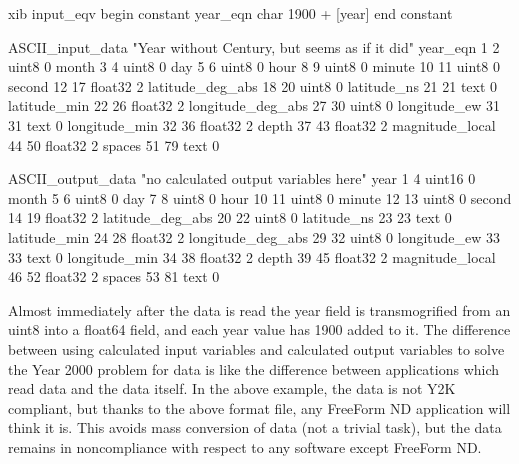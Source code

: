 \begin{vcode}{xib}
input_eqv
begin constant
year_eqn char 1900 + [year]
end constant

ASCII_input_data        "Year without Century, but seems as if it did"
year_eqn           1  2   uint8 0
month              3  4   uint8 0
day                5  6   uint8 0
hour               8  9   uint8 0
minute            10 11   uint8 0
second            12 17 float32 2
latitude_deg_abs  18 20   uint8 0
latitude_ns       21 21    text 0
latitude_min      22 26 float32 2
longitude_deg_abs 27 30   uint8 0
longitude_ew      31 31    text 0
longitude_min     32 36 float32 2
depth             37 43 float32 2
magnitude_local   44 50 float32 2
spaces            51 79    text 0

ASCII_output_data       "no calculated output variables here"
year               1  4  uint16 0
month              5  6   uint8 0
day                7  8   uint8 0
hour              10 11   uint8 0
minute            12 13   uint8 0
second            14 19 float32 2
latitude_deg_abs  20 22   uint8 0
latitude_ns       23 23    text 0
latitude_min      24 28 float32 2
longitude_deg_abs 29 32   uint8 0
longitude_ew      33 33    text 0
longitude_min     34 38 float32 2
depth             39 45 float32 2
magnitude_local   46 52 float32 2
spaces            53 81    text 0 
\end{vcode}

Almost immediately after the data is read the year field is
transmogrified from an uint8 into a float64 field, and each year value
has 1900 added to it. The difference between using calculated input
variables and calculated output variables to solve the Year 2000
problem for data is like the difference between applications which
read data and the data itself.  In the above example, the data is not
Y2K compliant, but thanks to the above format file, any FreeForm ND
application will think it is.  This avoids mass conversion of data
(not a trivial task), but the data remains in noncompliance with
respect to any software except FreeForm ND.




